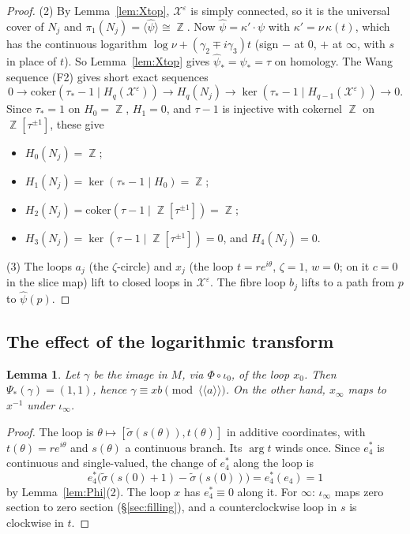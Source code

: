 \documentclass{article}
\DeclareMathOperator{\Z}{\mathbb{Z}}
\newtheorem{lemma}[theorem]{Lemma}
\theoremstyle{definition}
\theoremstyle{plain}
\newcommand{\cX}{\mathcal{X}}
\begin{document}
\begin{proof}
(2) By Lemma~\ref{lem:Xtop}, $\cX^\varepsilon$ is simply connected, so it is the universal
cover of $N_j$ and $\pi_1(N_j)=\langle\hat\psi\rangle\cong\Z$. Now $\hat\psi=\kappa'\cdot\psi$
with $\kappa'=\nu\,\kappa(t)$, which has the continuous logarithm $\log\nu+(\gamma_2\mp i\gamma_3)t$ (sign $-$ at $0$, $+$ at $\infty$, with $s$ in place of $t$). So Lemma~\ref{lem:Xtop} gives $\hat\psi_*=\psi_*=\tau$ on homology. The
Wang sequence (F2) gives short exact sequences
\[0\to\mathrm{coker}(\tau_*-1\mid H_q(\cX^\varepsilon))\to H_q(N_j)\to\ker(\tau_*-1\mid H_{q-1}(\cX^\varepsilon))\to0.\]
Since $\tau_*=1$ on $H_0=\Z$, $H_1=0$, and $\tau-1$ is injective with cokernel $\Z$ on
$\Z[\tau^{\pm1}]$, these give
\begin{itemize}
\item $H_0(N_j)=\Z$;
\item $H_1(N_j)=\ker(\tau_*-1\mid H_0)=\Z$;
\item $H_2(N_j)=\mathrm{coker}(\tau-1\mid\Z[\tau^{\pm1}])=\Z$;
\item $H_3(N_j)=\ker(\tau-1\mid\Z[\tau^{\pm1}])=0$, and $H_4(N_j)=0$.
\end{itemize}

(3) The loops $a_j$ (the $\zeta$-circle) and $x_j$ (the loop $t=re^{i\theta}$,
$\zeta=1$, $w=0$; on it $c=0$ in the slice map) lift to closed loops in
$\cX^\varepsilon$. The fibre loop $b_j$ lifts to a path from $p$ to $\hat\psi(p)$.
\end{proof}

\subsection{The effect of the logarithmic transform}
\begin{lemma}\label{lem:twistclass}
Let $\gamma$ be the image in $M$, via $\Phi\circ\iota_0$, of the loop $x_0$. Then
$\Psi_*(\gamma)=(1,1)$, hence $\gamma\equiv xb\pmod{\langle\!\langle a\rangle\!\rangle}$. On the other
hand, $x_\infty$ maps to $x^{-1}$ under $\iota_\infty$.
\end{lemma}
\begin{proof}
The loop is $\theta\mapsto[\tilde\sigma(s(\theta)),t(\theta)]$ in additive coordinates, with
$t(\theta)=re^{i\theta}$ and $s(\theta)$ a continuous branch. Its $\arg t$ winds once.
Since $e_4^*$ is continuous and single-valued, the change of $e_4^*$ along the loop is
\[e_4^*\big(\tilde\sigma(s(0)+1)-\tilde\sigma(s(0))\big)=e_4^*(e_4)=1\]
by Lemma~\ref{lem:Phi}(2). The loop $x$ has $e_4^*\equiv0$ along it. For $\infty$:
$\iota_\infty$ maps zero section to zero section (\S\ref{sec:filling}), and a
counterclockwise loop in $s$ is clockwise in $t$.
\end{proof}
\end{document}
